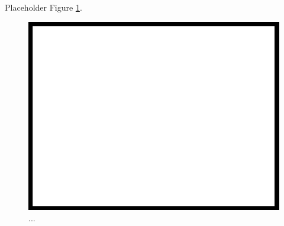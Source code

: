 Placeholder Figure \ref{fig:dummy}.

\begin{figure}
\centering
\includegraphics[width=1.0\columnwidth]{media/dummy.jpg}
\caption{...}
\label{fig:dummy}
\end{figure}
